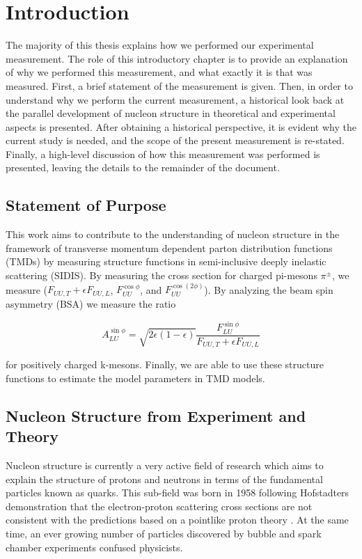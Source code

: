 \chapter{Introduction}
The majority of this thesis explains how we performed our experimental measurement.  The role of this introductory chapter is to provide an explanation of why we performed this measurement, and what exactly it is that was measured.  First, a brief statement of the measurement is given.  Then, in order to understand why we perform the current measurement, a historical look back at the parallel development of nucleon structure in theoretical and experimental aspects is presented.  After obtaining a historical perspective, it is evident why the current study is needed, and the scope of the present measurement is re-stated.  Finally, a high-level discussion of how this measurement was performed is presented, leaving the details to the remainder of the document.

\section{Statement of Purpose}
This work aims to contribute to the understanding of nucleon structure in the framework of transverse momentum dependent parton distribution functions (TMDs) by measuring structure functions in semi-inclusive deeply inelastic scattering (SIDIS).  By measuring the cross section for charged pi-mesons $\pi^{\pm}$, we measure ($F_{UU,T} + \epsilon F_{UU,L}$, $F_{UU}^{\cos\phi}$, and $F_{UU}^{\cos(2\phi)}$).  By analyzing the beam spin asymmetry (BSA) we measure the ratio

\begin{equation}
  A_{LU}^{\sin\phi} = \sqrt{2\epsilon(1-\epsilon)} \frac{F_{LU}^{\sin\phi}}{F_{UU,T}+\epsilon F_{UU,L}}
\end{equation}

for positively charged k-mesons.  Finally, we are able to use these structure functions to estimate the model parameters in TMD models.

\section{Nucleon Structure from Experiment and Theory}

Nucleon structure is currently a very active field of research which aims to explain the structure of protons and neutrons in terms of the fundamental particles known as quarks.  This sub-field was born in 1958 following Hofstadters demonstration that the electron-proton scattering cross sections are not consistent with the predictions based on a pointlike proton theory \cite{physics-hofstadter}.  At the same time, an ever growing number of particles discovered by bubble and spark chamber experiments confused physicists.

